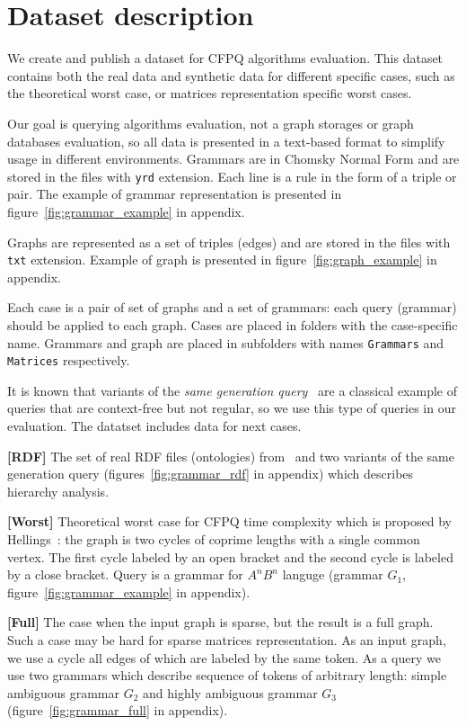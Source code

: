 \section{Dataset description}

We create and publish a dataset for CFPQ algorithms evaluation.
This dataset contains both the real data and synthetic data for different specific cases, such as the theoretical worst case, or matrices representation specific worst cases.

Our goal is querying algorithms evaluation, not a graph storages or graph databases evaluation, so all data is presented in a text-based format to simplify usage in different environments.
Grammars are in Chomsky Normal Form and are stored in the files with \verb|yrd| extension.
Each line is a rule in the form of a triple or pair.
The example of grammar representation is presented in figure~\ref{fig:grammar_example} in appendix.

Graphs are represented as a set of triples (edges) and are stored in the files with \verb|txt| extension.
Example of graph is presented in figure~\ref{fig:graph_example} in appendix.

Each case is a pair of set of graphs and a set of grammars: each query (grammar) should be applied to each graph.
Cases are placed in folders with the case-specific name.
Grammars and graph are placed in subfolders with names \verb|Grammars| and \verb|Matrices| respectively.


It is known that variants of the \textit{same generation query}~\cite{FndDB} are a classical example of queries that are context-free but not regular, so we use this type of queries in our evaluation.
The datatset includes data for next cases.

\textbf{[RDF]} The set of real RDF files (ontologies) from~\cite{RDF} and two variants of the same generation query (figures~\ref{fig:grammar_rdf} in appendix) which describes hierarchy analysis.

\textbf{[Worst]} Theoretical worst case for CFPQ time complexity which is proposed by Hellings~\cite{hellingsPathQuerying}: the graph is two cycles of coprime lengths with a single common vertex.
The first cycle labeled by an open bracket and the second cycle is labeled by a close bracket.
Query is a grammar for $A^nB^n$ languge (grammar $G_1$, figure~\ref{fig:grammar_example} in appendix).

\textbf{[Full]} The case when the input graph is sparse, but the result is a full graph.
Such a case may be hard for sparse matrices representation.
As an input graph, we use a cycle all edges of which are labeled by the same token.
As a query we use two grammars which describe sequence of tokens of arbitrary length: simple ambiguous grammar $G_2$  and highly ambiguous grammar $G_3$ (figure~\ref{fig:grammar_full} in appendix).

